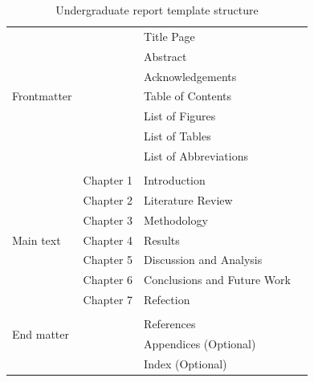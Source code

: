 \begin{table}[!ht]
    \centering
    \caption{Undergraduate report template structure}
    \label{tab:gen_template}
    \begin{tabular}{llll}     
        \toprule
        \multirow{7}{3cm}{Frontmatter} 
        & & Title Page & \\                  
        & & Abstract &    \\          
        & & Acknowledgements & \\                            
        & & Table of Contents &    \\                                
        & & List of Figures   &    \\                        
        & & List of Tables    &    \\                
        & & List of Abbreviations  &    \\                     
        & &   &    \\                        
        \multirow{7}{3cm}{Main text}
        & Chapter 1 & Introduction   &    \\                         
        & Chapter 2 & Literature Review   &    \\
        & Chapter 3 & Methodology   &    \\
        & Chapter 4 & Results    &    \\
        & Chapter 5 & Discussion and Analysis  &    \\
        & Chapter 6 & Conclusions and Future Work  &    \\        
        & Chapter 7 & Refection  &    \\          
        & &   &    \\                       
        \multirow{2}{3cm}{End matter}
        & & References  &    \\   
        & & Appendices (Optional)  &    \\ 
        & & Index (Optional)  &    \\ 
        \bottomrule
    \end{tabular}
\end{table}


